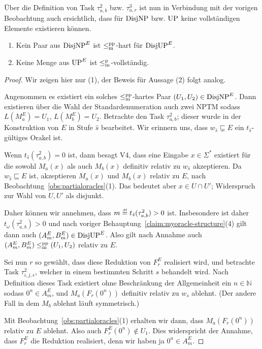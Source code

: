 Über die Definition von Task $\tau^2_{a,b}$ bzw. $\tau^3_{a,r}$ ist nun in Verbindung mit der vorigen Beobachtung auch ersichtlich, dass für $\mathrm{DisjNP}$ bzw. $\mathrm{UP}$ keine vollständigen Elemente existieren können.

\begin{claim}\label{claim:myoracle-completness}
    \begin{enumerate}
        \item Kein Paar aus $\mathrm{DisjNP}^E$ ist $\leq_\mathrm{m}^\mathrm{pp}$-hart für $\mathrm{DisjUP}^E$.
        \item Keine Menge aus $\mathrm{UP}^E$ ist $\leq_\mathrm{m}^\mathrm{p}$-vollständig.
    \end{enumerate}
\end{claim}
\begin{proof}
    Wir zeigen hier nur (1), der Beweis für Aussage (2) folgt analog.

    Angenommen es existiert ein solches $\leq_\mathrm{m}^\mathrm{pp}$-hartes Paar $(U_1, U_2)\in\mathrm{DisjNP}^E$.
    Dann existieren über die Wahl der Standardenumeration auch zwei NPTM sodass $L(M_a^E)=U_1$, $L(M_b^E)=U_2$.
    Betrachte den Task $\tau^2_{a,b}$; dieser wurde in der Konstruktion von $E$ in Stufe $\hat{s}$ bearbeitet.
    Wir erinnern uns, dass $w_{\hat{s}}\sqsubsetneq E$ ein $t_{\hat{s}}$-gültiges Orakel ist.

    Wenn $t_{\hat{s}}(\tau^2_{a,b})=0$ ist, dann besagt V4, dass eine Eingabe $x\in\Sigma^*$ existiert für die sowohl $M_a(x)$ als auch $M_b(x)$ definitiv relativ zu $w_{\hat{s}}$ akzeptieren. Da $w_{\hat{s}}\sqsubseteq E$ ist, akzeptieren $M_a(x)$ und $M_b(x)$ relativ zu $E$, nach Beobachtung~\ref{obs:partialoracles}(1).
    Das bedeutet aber $x\in U\cap U'$; Widerspruch zur Wahl von $U, U'$ als disjunkt.

    Daher können wir annehmen, dass $m\stackrel{\text{\smash{\tiny df}}}{=}  t_{\hat{s}}(\tau^2_{a,b})>0$ ist.
    Insbesondere ist daher $t_\omega(\tau^2_{a,b})>0$ und nach voriger Behauptung~\ref{claim:myoracle-structure}(4) gilt dann auch $(A^E_m, B^E_m)\in\mathrm{DisjUP}^E$. Also gilt nach Annahme auch $(A^E_m, B^E_m) \leq_\mathrm{m}^\mathrm{pp} (U_1, U_2)$ relativ zu $E$.
    
    Sei nun $r$ so gewählt, dass diese Reduktion von $F^E_r$ realisiert wird, und betrachte Task  $\tau^2_{i,j,r}$, welcher in einem bestimmten Schritt $s$ behandelt wird.
    Nach Definition dieses Task existiert ohne Beschränkung der Allgemeinheit ein $n\in\mathbb N$ sodass $0^n\in A_m^E$, und $M_a(F_r(0^n))$ definitiv relativ zu $w_s$ ablehnt. (Der andere Fall in dem $M_b$ ablehnt läuft symmetrisch.)

    Mit Beobachtung~\ref{obs:partialoracles}(1) erhalten wir dann, dass $M_a(F_r(0^n))$ relativ zu $E$ ablehnt. Also auch $F^E_r(0^n)\not\in U_1$. Dies widerspricht der Annahme, dass $F_r^E$ die Reduktion realisiert, denn wir haben ja $0^n\in A_m^E$.
\end{proof}

